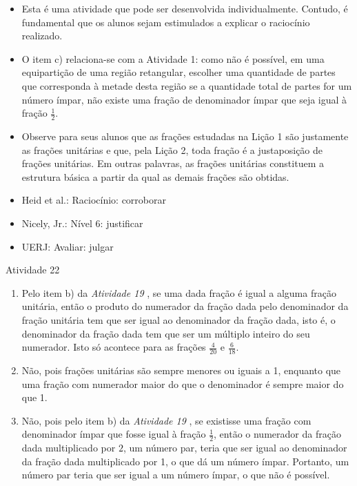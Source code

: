 \begin{itemize} %
    \item       Esta é uma atividade que pode ser desenvolvida individualmente.
Contudo, é fundamental que os alunos sejam estimulados a explicar o raciocínio
realizado.
    \item       O item c) relaciona-se com a Atividade 1: como não é possível,
em uma equipartição de uma região retangular, escolher uma quantidade de partes
que corresponda à metade desta região se a quantidade total de partes for um
número ímpar, não existe uma fração de denominador ímpar que seja igual à fração
      $\frac{1}{2}$.
    \item       Observe para seus alunos que as frações estudadas na Lição 1 são
justamente as frações unitárias e que, pela Lição 2, toda fração é a
justaposição de frações unitárias. Em outras palavras, as frações unitárias
constituem a estrutura básica a partir da qual as demais frações são obtidas.
\end{itemize} %


   \vspace{.1cm}

 \vspace{.1cm}

\begin{itemize} %
    \item       Heid et al.: Raciocínio: corroborar
    \item       Nicely, Jr.: Nível 6: justificar
    \item       UERJ: Avaliar: julgar
\end{itemize} %

\begin{resposta*}{Atividade 22}
\begin{enumerate} [\quad a)] %
    \item       Pelo item b) da \emph{Atividade 19}      , se uma dada fração é
igual a alguma fração unitária, então o produto do numerador da fração dada pelo
denominador da fração unitária tem que ser igual ao denominador da fração dada,
isto é, o denominador da fração dada tem que ser um múltiplo inteiro do seu
numerador. Isto só acontece para as frações       $\frac{4}{20}$       e
$\frac{6}{18}$.
    \item       Não, pois frações unitárias são sempre menores ou iguais a 1,
enquanto que uma fração com numerador maior do que o denominador é sempre maior
do que 1.

    \item       Não, pois pelo item b) da \emph{Atividade 19}      , se
existisse uma fração com denominador ímpar que fosse igual à fração
$\frac{1}{2}$, então o numerador da fração dada multiplicado por       $2$, um
número par, teria que ser igual ao denominador da fração dada multiplicado por
1, o que dá um número ímpar. Portanto, um número par teria que ser igual a um
número ímpar, o que não é possível.
\end{enumerate} %

\end{resposta*}
\pagebreak

